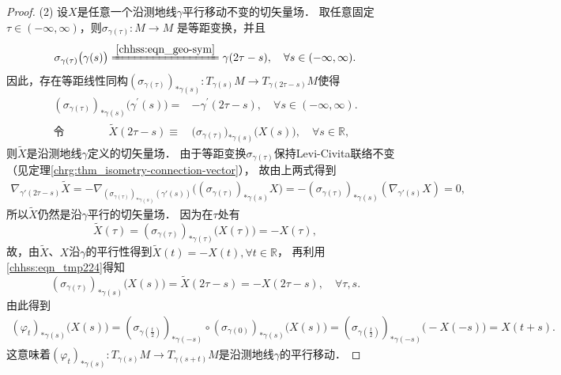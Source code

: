 \begin{proof}
(2) 设$X$是任意一个沿测地线$\gamma$平行移动不变的切矢量场．
取任意固定$\tau \in(-\infty, \infty)$，则$\sigma_{\gamma(\tau)}: M \rightarrow M$ 是等距变换，并且
\begin{equation}
\sigma_{\gamma(\tau)}\bigl(\gamma(s)\bigr) \xlongequal{\ref{chhss:eqn_geo-sym}}
\gamma(2 \tau-s), \quad \forall s \in(-\infty, \infty) .
\end{equation}
因此，存在等距线性同构$(\sigma_{\gamma(\tau)})_{* \gamma(s)}: T_{\gamma(s)} M \rightarrow T_{\gamma(2 \tau-s)}M$使得
\begin{align}
    (\sigma_{\gamma(\tau)})_{* \gamma(s)} \bigl(\gamma^{\prime}(s)\bigr)
    = & -\gamma^{\prime}(2 \tau-s), \quad \forall s \in(-\infty, \infty) . \\
    \text{令}\qquad\qquad \tilde{X}(2 \tau-s)\equiv&
    \bigl(\sigma_{\gamma(\tau)}\bigr)_{* \gamma(s)}\bigl(X(s)\bigr), 
    \quad \forall s\in \mathbb{R},  \label{chhss:eqn_tmp224}
\end{align}
则$\tilde{X}$是沿测地线$\gamma$定义的切矢量场．
由于等距变换$\sigma_{\gamma(\tau)}$保持Levi-Civita联络不变
（见定理\ref{chrg:thm_isometry-connection-vector}），
故由上两式得到
\begin{align*}
    \nabla_{\gamma'(2 \tau-s)} \tilde{X} = -\nabla_{(\sigma_{\gamma(\tau)})_{* \gamma(s)}(\gamma'(s))}
        \bigl((\sigma_{\gamma(\tau)})_{* \gamma(s)} X \bigr) 
     =-(\sigma_{\gamma(\tau)})_{*\gamma(s)}(\nabla_{\gamma'(s)} X)=0,
\end{align*}
所以$\tilde{X}$仍然是沿$\gamma$平行的切矢量场．
因为在$\tau$处有
\begin{equation}
    \tilde{X}(\tau)=(\sigma_{\gamma(\tau)})_{* \gamma(\tau)} \bigl(X(\tau)\bigr) = -X(\tau) ,
\end{equation}
故，由$\tilde{X}$、$X$沿$\gamma$的平行性得到$\tilde{X}(t)=-X(t), \forall t \in\mathbb{R}$，
再利用\eqref{chhss:eqn_tmp224}得知
\begin{equation}
    (\sigma_{\gamma(\tau)})_{*\gamma(s)}\bigl(X(s)\bigr)
    =\tilde{X}(2 \tau-s) = -X(2 \tau-s), \quad \forall \tau, s .
\end{equation}
由此得到
\begin{align*}
    (\varphi_t)_{* \gamma(s)}\bigl(X(s)\bigr) = (\sigma_{\gamma(\frac{t}{2})})_{* \gamma(-s)}
      \circ (\sigma_{\gamma(0)})_{* \gamma(s)}\bigl(X(s)\bigr) 
    = (\sigma_{\gamma(\frac{t}{2} ) } )_{* \gamma(-s)} \bigl(-X(-s)\bigr)=X(t+s) .
\end{align*}  %
这意味着$(\varphi_t)_{* \gamma(s)}: T_{\gamma(s)} M \to T_{\gamma(s+t)} M$是沿测地线$\gamma$的平行移动．


\end{proof}
